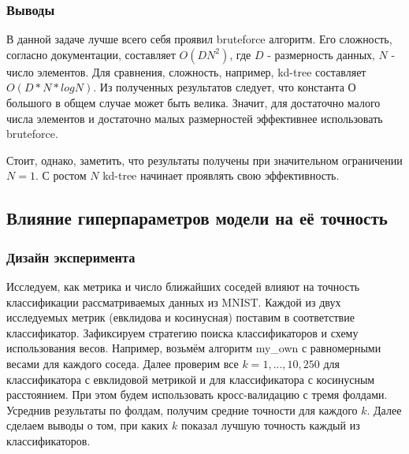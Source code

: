 \documentclass{article}
\begin{document}
        \subsubsection{Выводы}
                В данной задаче лучше всего себя проявил bruteforce алгоритм.
                Его сложность, согласно документации, составляет $O(DN^2)$, где
                $D$ - размерность данных, $N$ - число элементов.
                Для сравнения, сложность, например, kd-tree составляет $O(D*N*logN)$.
                Из полученных результатов следует, что константа О большого в общем случае может быть велика.
                Значит, для достаточно малого числа элементов и достаточно малых размерностей эффективнее использовать bruteforce.

                Стоит, однако, заметить, что результаты получены при значительном ограничении $N=1$. С ростом $N$ kd-tree начинает проявлять свою эффективность.
    \subsection{Влияние гиперпараметров модели на её точность}
        \subsubsection{Дизайн эксперимента}
                Исследуем, как метрика и число ближайших соседей влияют на точность классификации рассматриваемых данных из MNIST.
                Каждой из двух исследуемых метрик (евклидова и косинусная) поставим в соответствие классификатор.
                Зафиксируем стратегию поиска классификаторов и схему использования весов. Например, возьмём алгоритм my\_own с равномерными весами для каждого соседа.
                Далее проверим все $k = 1, ..., 10, 250$ для классификатора с евклидовой метрикой и для классификатора с косинусным расстоянием.
                При этом будем использовать кросс-валидацию с тремя фолдами. Усреднив результаты по фолдам, получим средние точности для каждого $k$.
                Далее сделаем выводы о том, при каких $k$ показал лучшую точность каждый из классификаторов.
\end{document}
